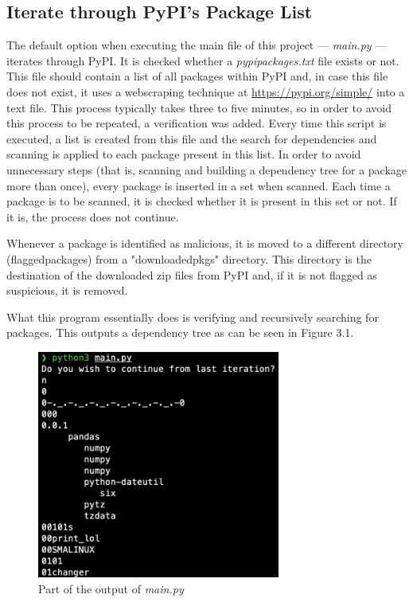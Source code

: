 \subsection{Iterate through PyPI's Package List}
The default option when executing the main file of this project — \textit{main.py} — iterates through PyPI. It is checked whether a \textit{pypipackages.txt} file exists or not. This file should contain a list of all packages within PyPI and, in case this file does not exist, it uses a webscraping technique at \url{https://pypi.org/simple/} into a text file. This process typically takes three to five minutes, so in order to avoid this process to be repeated, a verification was added. Every time this script is executed, a list is created from this file and the search for dependencies and scanning is applied to each package present in this list. In order to avoid unnecessary steps (that is, scanning and building a dependency tree for a package more than once), every package is inserted in a set when scanned. Each time a package is to be scanned, it is checked whether it is present in this set or not. If it is, the process does not continue.

Whenever a package is identified as malicious, it is moved to a different directory (flaggedpackages) from a "downloadedpkgs" directory. This directory is the destination of the downloaded zip files from PyPI and, if it is not flagged as suspicious, it is removed.

What this program essentially does is verifying and recursively searching for packages. This outputs a dependency tree as can be seen in Figure 3.1.

\begin{figure}[ht]
\centering
\includegraphics[width=8cm]{images/mainexe}
\caption{Part of the output of \textit{main.py}}
\end{figure}

